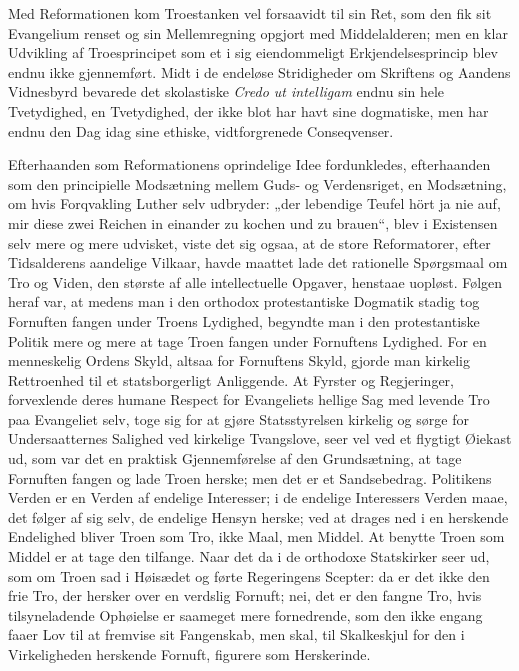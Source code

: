 \documentclass[12pt]{book}
\newcommand{\opage}[1]{\marginnote{\footnotesize\textit{[#1]}}}
\begin{document}
Med Reformationen kom Troestanken vel forsaavidt
til sin Ret, som den fik sit Evangelium renset og sin
Mellemregning opgjort med Middelalderen; men en klar
Udvikling af Troesprincipet som et i sig eiendommeligt
Erkjendelsesprincip blev endnu ikke gjennemført. Midt
i de endeløse Stridigheder om Skriftens og Aandens
Vidnesbyrd bevarede det skolastiske \textit{Credo ut intelligam}
endnu sin hele Tvetydighed, en Tvetydighed, der ikke
blot har havt sine dogmatiske, men har endnu den Dag
idag sine ethiske, vidtforgrenede Conseqvenser.

Efterhaanden som Reformationens oprindelige Idee
fordunkledes, efterhaanden som den principielle Modsætning
mellem Guds- og Verdensriget, en Modsætning, om hvis
Forqvakling Luther selv udbryder: „der lebendige Teufel
hört ja nie auf, mir diese zwei Reichen in einander zu
kochen und zu brauen“, blev i Existensen selv mere og
mere udvisket, viste det sig ogsaa, at de store Reformatorer,
efter Tidsalderens aandelige Vilkaar, havde maattet
lade det rationelle Spørgsmaal om Tro og Viden, den
største af alle intellectuelle Opgaver, henstaae uopløst.
Følgen heraf var, at medens man i den orthodox protestantiske
Dogmatik stadig tog Fornuften fangen under
Troens Lydighed, begyndte man i den protestantiske
Politik mere og mere at tage Troen fangen under Fornuftens
Lydighed. For en menneskelig Ordens Skyld,
altsaa for Fornuftens Skyld, gjorde man kirkelig Rettroenhed
til et statsborgerligt Anliggende. At Fyrster
og Regjeringer, forvexlende deres humane Respect for
Evangeliets hellige Sag med levende Tro paa Evangeliet
selv, toge sig for at gjøre Statsstyrelsen kirkelig og sørge
\opage{33}\setcounter{footnote}{0}%
for Undersaatternes Salighed ved kirkelige Tvangslove,
seer vel ved et flygtigt Øiekast ud, som var det en
praktisk Gjennemførelse af den Grundsætning, at tage
Fornuften fangen og lade Troen herske; men det er et
Sandsebedrag. Politikens Verden er en Verden af endelige
Interesser; i de endelige Interessers Verden maae,
det følger af sig selv, de endelige Hensyn herske; ved
at drages ned i en herskende Endelighed bliver Troen
som Tro, ikke Maal, men Middel. At benytte Troen
som Middel er at tage den tilfange. Naar det da i de
orthodoxe Statskirker seer ud, som om Troen sad i
Høisædet og førte Regeringens Scepter: da er det ikke
den frie Tro, der hersker over en verdslig Fornuft; nei,
det er den fangne Tro, hvis tilsyneladende Ophøielse er
saameget mere fornedrende, som den ikke engang faaer
Lov til at fremvise sit Fangenskab, men skal, til Skalkeskjul
for den i Virkeligheden herskende Fornuft, figurere
som Herskerinde.
\end{document}
